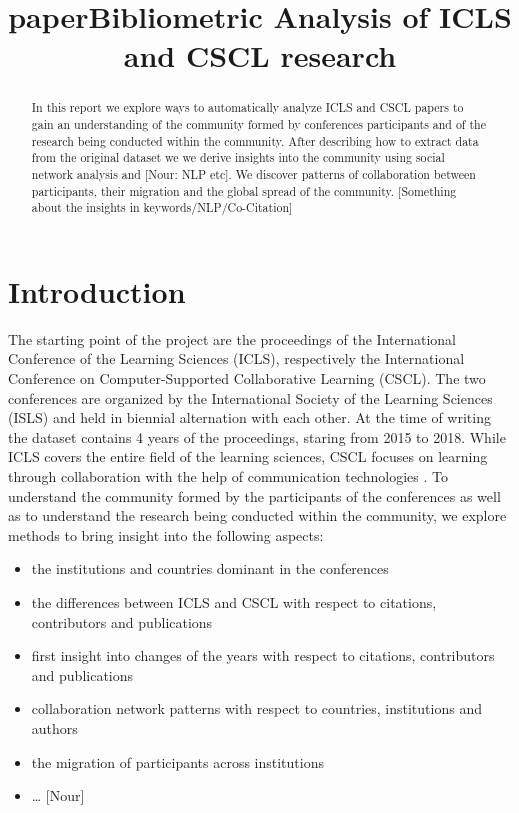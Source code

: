 \documentclass[journal,twocolumn]{IEEEtran}
\title{paper}
\providecommand{\tightlist}{%
      \setlength{\itemsep}{0pt}\setlength{\parskip}{0pt}}
\begin{document}
    
    
    
\renewcommand{\figurename}{Figure}
\captionsetup{labelformat=simple}\title{Bibliometric Analysis of ICLS and CSCL research}
\author{\par
}
\maketitle

    
    

    

\begin{abstract}
    In this report we explore ways to automatically analyze ICLS and CSCL
papers to gain an understanding of the community formed by conferences
participants and of the research being conducted within the community.
After describing how to extract data from the original dataset we we
derive insights into the community using social network analysis and
{[}Nour: NLP etc{]}. We discover patterns of collaboration between
participants, their migration and the global spread of the community.
{[}Something about the insights in keywords/NLP/Co-Citation{]}
\end{abstract}
    \hypertarget{introduction}{%
\section{Introduction}\label{introduction}}

The starting point of the project are the proceedings of the
International Conference of the Learning Sciences (ICLS), respectively
the International Conference on Computer-Supported Collaborative
Learning (CSCL). The two conferences are organized by the International
Society of the Learning Sciences (ISLS) and held in biennial alternation
with each other. At the time of writing the dataset contains 4 years of
the proceedings, staring from 2015 to 2018. While ICLS covers the entire
field of the learning sciences, CSCL focuses on learning through
collaboration with the help of communication technologies \cite{ICLS}.
To understand the community formed by the participants of the
conferences as well as to understand the research being conducted within
the community, we explore methods to bring insight into the following
aspects:

\begin{itemize}
\tightlist
\item
  the institutions and countries dominant in the conferences
\item
  the differences between ICLS and CSCL with respect to citations,
  contributors and publications
\item
  first insight into changes of the years with respect to citations,
  contributors and publications
\item
  collaboration network patterns with respect to countries, institutions
  and authors
\item
  the migration of participants across institutions
\item
  \ldots{} {[}Nour{]}
\end{itemize}
\end{document}
